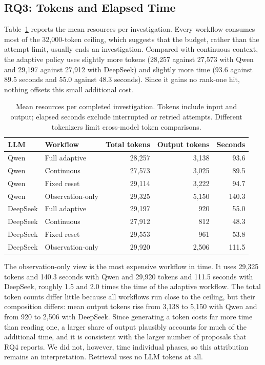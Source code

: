 \documentclass[a4paper,fleqn]{cas-sc}
\begin{document}
\subsection{RQ3: Tokens and Elapsed Time}\label{sec:rq3}
Table~\ref{tab:eval-cost} reports the mean resources per investigation. Every workflow consumes most of the 32,000-token ceiling, which suggests that the budget, rather than the attempt limit, usually ends an investigation. Compared with continuous context, the adaptive policy uses slightly more tokens (28,257 against 27,573 with Qwen and 29,197 against 27,912 with DeepSeek) and slightly more time (93.6 against 89.5 seconds and 55.0 against 48.3 seconds). Since it gains no rank-one hit, nothing offsets this small additional cost.

\begin{table}[pos=!htbp]
\caption{Mean resources per completed investigation. Tokens include input and output; elapsed seconds exclude interrupted or retried attempts. Different tokenizers limit cross-model token comparisons.}\label{tab:eval-cost}
\centering\small
\begin{tabular*}{\textwidth}{@{\extracolsep{\fill}}llrrr@{}}\toprule
LLM & Workflow & Total tokens & Output tokens & Seconds\\\midrule
Qwen & Full adaptive & 28,257 & 3,138 & 93.6\\
Qwen & Continuous & 27,573 & 3,025 & 89.5\\
Qwen & Fixed reset & 29,114 & 3,222 & 94.7\\
Qwen & Observation-only & 29,325 & 5,150 & 140.3\\
\midrule
DeepSeek & Full adaptive & 29,197 & 920 & 55.0\\
DeepSeek & Continuous & 27,912 & 812 & 48.3\\
DeepSeek & Fixed reset & 29,553 & 961 & 53.8\\
DeepSeek & Observation-only & 29,920 & 2,506 & 111.5\\
\bottomrule\end{tabular*}
\end{table}

The observation-only view is the most expensive workflow in time. It uses 29,325 tokens and 140.3 seconds with Qwen and 29,920 tokens and 111.5 seconds with DeepSeek, roughly 1.5 and 2.0 times the time of the adaptive workflow. The total token counts differ little because all workflows run close to the ceiling, but their composition differs: mean output tokens rise from 3,138 to 5,150 with Qwen and from 920 to 2,506 with DeepSeek. Since generating a token costs far more time than reading one, a larger share of output plausibly accounts for much of the additional time, and it is consistent with the larger number of proposals that RQ4 reports. We did not, however, time individual phases, so this attribution remains an interpretation. Retrieval uses no LLM tokens at all.
\end{document}
